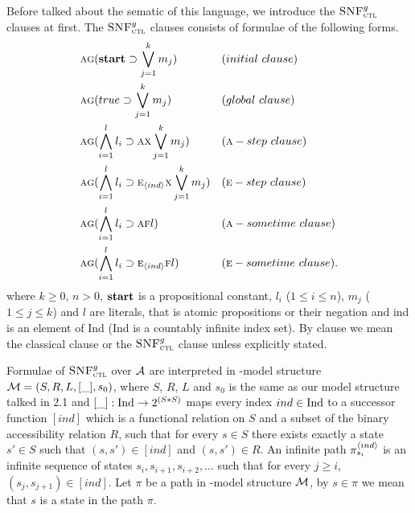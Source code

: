 \documentclass{article}
\begin{document}
Before talked about the sematic of this language, we introduce the ${\textsc{SNF}_{\textsc{ctl}}^g}$ clauses at first. The ${\textsc{SNF}_{\textsc{ctl}}^g}$ clauses consists of formulae of the following forms.
\begin{align*}
& \ALL \GLOBAL(\start \supset \bigvee_{j=1}^k m_j) && (initial\ clause) \\
& \ALL \GLOBAL(true \supset \bigvee_{j=1}^k m_j) && (global\ clause) \\
& \ALL \GLOBAL(\bigwedge_{i=1}^l l_i \supset \ALL \NEXT \bigvee_{j=1}^k m_j) && (\ALL-step\ clause)\\
& \ALL \GLOBAL(\bigwedge_{i=1}^l l_i \supset \EXIST_\tuple{ind} \NEXT \bigvee_{j=1}^k m_j) && (\EXIST-step\ clause)\\
& \ALL \GLOBAL(\bigwedge_{i=1}^l l_i \supset \ALL \FUTURE l) && (\ALL-sometime\ clause)\\
& \ALL \GLOBAL(\bigwedge_{i=1}^l l_i \supset \EXIST_{\tuple{ind}} \FUTURE l) && (\EXIST-sometime\ clause).
\end{align*}
where $k \ge 0$, $n > 0$, $\textbf{start}$ is a propositional constant, $l_i$ ($1 \le i \le n$), $m_j$ ($1 \le j \le k$) and $l$ are literals, that is atomic propositions or their negation and ind is an element of Ind (Ind is a countably infinite index set). By clause we mean the classical clause or the ${\textsc{SNF}_{\textsc{ctl}}^g}$ clause unless explicitly stated.

Formulae of ${\textsc{SNF}_{\textsc{ctl}}^g}$ over ${\cal A}$ are interpreted in \Ind-model structure ${\cal M}=(S,R,L, [\_], s_0)$, where $S$, $R$, $L$ and $s_0$ is the same as our model structure talked in 2.1 and $[\_]: \textrm{Ind} \rightarrow 2^{(S*S)}$ maps every index $ind \in \textrm{Ind}$ to a successor function $[ind]$ which is a functional relation on $S$ and a subset of the binary accessibility relation $R$, such that for every $s\in S$ there exists exactly a state $s'\in S$ such that $(s,s')\in [ind]$ and $(s,s')\in R$.
An infinite path $\pi_{s_i}^{{\langle{ind}\rangle}}$ is an infinite sequence of states $s_i, s_{i+1}, s_{i+2},\dots$ such that for every $j\geq i$, $(s_j, s_{j+1})\in [ind]$.
Let $\pi$ be a path in \Ind-model structure ${\cal M}$, by $s\in \pi$ we mean that $s$ is a state in the path $\pi$.
\end{document}
